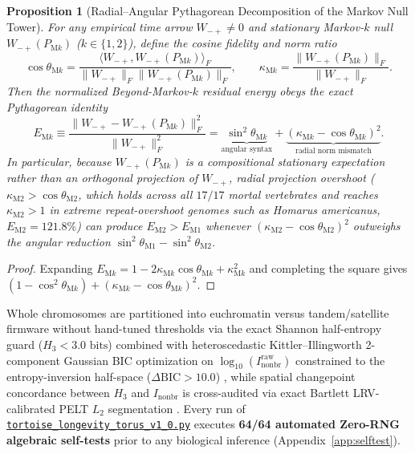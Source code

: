 \documentclass[11pt,a4paper]{article}
\renewcommand{\_}{\origunderscore\penalty200\relax}
\newtheorem{proposition}[theorem]{Proposition}
\theoremstyle{remark}
\begin{document}
\begin{proposition}[Radial--Angular Pythagorean Decomposition of the Markov Null Tower]
\label{prop:radial_angular}
For any empirical time arrow $W_{-+} \ne 0$ and stationary Markov-$k$ null $W_{-+}(P_{\mathrm{M}k})$ ($k \in \{1,2\}$), define the cosine fidelity and norm ratio
\[
\cos\theta_{\mathrm{M}k} = \frac{\langle W_{-+}, W_{-+}(P_{\mathrm{M}k})\rangle_F}{\|W_{-+}\|_F \|W_{-+}(P_{\mathrm{M}k})\|_F}, \qquad \kappa_{\mathrm{M}k} = \frac{\|W_{-+}(P_{\mathrm{M}k})\|_F}{\|W_{-+}\|_F}.
\]
Then the normalized Beyond-Markov-$k$ residual energy obeys the exact Pythagorean identity
\begin{equation}
E_{\mathrm{M}k} \equiv \frac{\|W_{-+} - W_{-+}(P_{\mathrm{M}k})\|_F^2}{\|W_{-+}\|_F^2} = \underbrace{\sin^2\theta_{\mathrm{M}k}}_{\text{angular syntax}} + \underbrace{(\kappa_{\mathrm{M}k} - \cos\theta_{\mathrm{M}k})^2}_{\text{radial norm mismatch}}.
\end{equation}
In particular, because $W_{-+}(P_{\mathrm{M}k})$ is a compositional stationary expectation rather than an orthogonal projection of $W_{-+}$, radial projection overshoot ($\kappa_{\mathrm{M2}} > \cos\theta_{\mathrm{M2}}$, which holds across all $17/17$ mortal vertebrates and reaches $\kappa_{\mathrm{M2}} > 1$ in extreme repeat-overshoot genomes such as \textit{Homarus americanus}, $E_{\mathrm{M2}} = 121.8\%$) can produce $E_{\mathrm{M2}} > E_{\mathrm{M1}}$ whenever $(\kappa_{\mathrm{M2}} - \cos\theta_{\mathrm{M2}})^2$ outweighs the angular reduction $\sin^2\theta_{\mathrm{M1}} - \sin^2\theta_{\mathrm{M2}}$.
\end{proposition}
\begin{proof}
Expanding $E_{\mathrm{M}k} = 1 - 2\kappa_{\mathrm{M}k}\cos\theta_{\mathrm{M}k} + \kappa_{\mathrm{M}k}^2$ and completing the square gives $(1 - \cos^2\theta_{\mathrm{M}k}) + (\kappa_{\mathrm{M}k} - \cos\theta_{\mathrm{M}k})^2$.
\end{proof}

Whole chromosomes are partitioned into euchromatin versus tandem/satellite firmware without hand-tuned thresholds via the exact Shannon half-entropy guard ($H_3 < 3.0\text{ bits}$) combined with heteroscedastic Kittler--Illingworth 2-component Gaussian BIC optimization on $\log_{10}(I_{\mathrm{nonbr}}^{\mathrm{raw}})$ constrained to the entropy-inversion half-space ($\Delta\mathrm{BIC} > 10.0$) \cite{Kittler1986}, while spatial changepoint concordance between $H_3$ and $I_{\mathrm{nonbr}}$ is cross-audited via exact Bartlett LRV-calibrated PELT $L_2$ segmentation \cite{Killick2012}.
Every run of \href{https://github.com/Dr-Logvinovich/longevity-codon-torus/blob/main/tortoise_longevity_torus_v1_0.py}{\nolinkurl{tortoise_longevity_torus_v1_0.py}} executes \textbf{64/64 automated Zero-RNG algebraic self-tests} prior to any biological inference (Appendix~\ref{app:selftest}).
\end{document}
